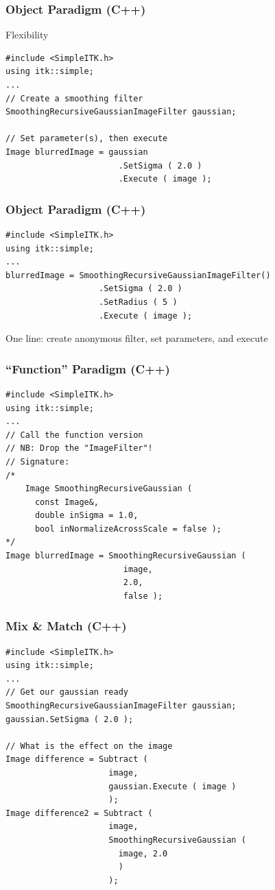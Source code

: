 \begin{frame}[fragile]
\frametitle{Object Paradigm (C++)}
Flexibility
\lstcpp
\begin{lstlisting}
#include <SimpleITK.h>
using itk::simple;
...
// Create a smoothing filter
SmoothingRecursiveGaussianImageFilter gaussian;

// Set parameter(s), then execute
Image blurredImage = gaussian
                       .SetSigma ( 2.0 )
                       .Execute ( image );
\end{lstlisting}
\end{frame}

\begin{frame}[fragile]
\frametitle{Object Paradigm (C++)}
\lstcpp
\begin{lstlisting}
#include <SimpleITK.h>
using itk::simple;
...
blurredImage = SmoothingRecursiveGaussianImageFilter()
                   .SetSigma ( 2.0 )
                   .SetRadius ( 5 )
                   .Execute ( image );
\end{lstlisting}
One line: create anonymous filter, set parameters, and execute
\end{frame}

\begin{frame}[fragile]
\frametitle{``Function'' Paradigm (C++)}
\lstcpp
\begin{lstlisting}
#include <SimpleITK.h>
using itk::simple;
...
// Call the function version
// NB: Drop the "ImageFilter"!
// Signature:
/*
    Image SmoothingRecursiveGaussian (
      const Image&,
      double inSigma = 1.0,
      bool inNormalizeAcrossScale = false );
*/
Image blurredImage = SmoothingRecursiveGaussian (
                        image,
                        2.0,
                        false );
\end{lstlisting}
\end{frame}

\begin{frame}[fragile]
\frametitle{Mix \& Match (C++)}
\lstcpp
\begin{lstlisting}
#include <SimpleITK.h>
using itk::simple;
...
// Get our gaussian ready
SmoothingRecursiveGaussianImageFilter gaussian;
gaussian.SetSigma ( 2.0 );

// What is the effect on the image
Image difference = Subtract (
                     image,
                     gaussian.Execute ( image )
                     );
Image difference2 = Subtract (
                     image,
                     SmoothingRecursiveGaussian (
                       image, 2.0
                       )
                     );

\end{lstlisting}
\end{frame}


